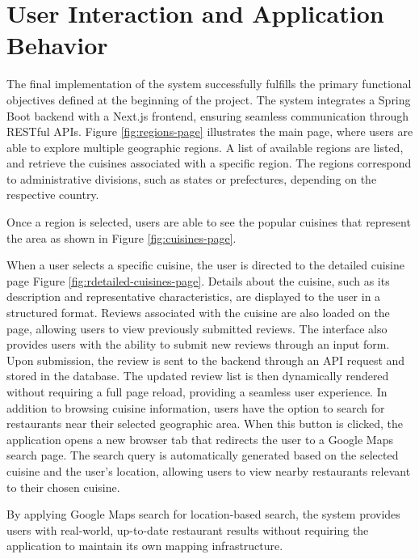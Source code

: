 \section{User Interaction and Application Behavior}
The final implementation of the system successfully fulfills the primary 
functional objectives defined at the beginning of the project. 
The system integrates a Spring Boot backend with a Next.js frontend, 
ensuring seamless communication through RESTful APIs.
Figure \ref{fig:regions-page} illustrates the main page, where users are able to explore multiple geographic regions.
A list of available regions are listed, and retrieve the cuisines associated with a specific region. 
The regions correspond to administrative divisions, such as states or prefectures, depending on the respective country.


\regionsFigure

Once a region is selected, users are able to see the popular cuisines that represent the area as shown in Figure \ref{fig:cuisines-page}.

\cuisinesFigure

When a user selects a specific cuisine, the user is directed to the detailed 
cuisine page Figure \ref{fig:rdetailed-cuisines-page}. Details about the cuisine, such as its description
and representative characteristics, are displayed to the user 
in a structured format. Reviews associated with the cuisine are also loaded
on the page, allowing users to view previously submitted reviews. 
The interface also provides users with the ability to submit new reviews 
through an input form. Upon submission, the review is sent to the backend 
through an API request and stored in the database. The updated review 
list is then dynamically rendered without requiring a full page reload, 
providing a seamless user experience. 
In addition to browsing cuisine information, users have the option 
to search for restaurants near their selected geographic area. 
When this button is clicked, the application opens a new browser tab 
that redirects the user to a Google Maps search page. 
The search query is automatically generated based on the selected 
cuisine and the user's location, allowing users to view nearby 
restaurants relevant to their chosen cuisine. 

By applying Google Maps search for location-based search, 
the system provides users with real-world, up-to-date restaurant 
results without requiring the application to maintain its own 
mapping infrastructure.

